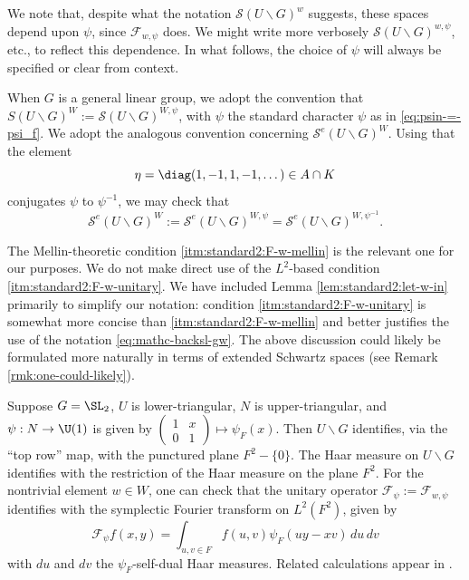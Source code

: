 \begin{remark}\label{rmk:we-note-that-dependence-psi-w}
  We note that, despite what the notation $\mathcal{S}(U \backslash G)^w$ suggests, these spaces depend upon $\psi$, since $\mathcal{F}_{w,\psi}$ does.  We might write more verbosely $\mathcal{S}(U \backslash G)^{w, \psi}$, etc., to reflect this dependence.  In what follows, the choice of $\psi$ will always be specified or clear from context.

  When $G$ is a general linear group, we adopt the convention that $S(U \backslash G)^W := \mathcal{S}(U \backslash G)^{W,\psi}$, with $\psi$ the standard character $\psi$ as in \eqref{eq:psin-=-psi_f}.  We adopt the analogous convention concerning $\mathcal{S}^e(U \backslash G)^W$.  Using that the element
  \begin{equation*}
    \eta = \diag(1,-1,1,-1,\dotsc) \in A \cap K
  \end{equation*}
  conjugates $\psi$ to $\psi^{-1}$, we may check that
  \begin{equation}\label{eq:mathc-backsl-gw-1}
    \mathcal{S}^e(U \backslash G)^W := \mathcal{S}^e(U \backslash G)^{W,\psi} = \mathcal{S}^e(U \backslash G)^{W,\psi^{-1}}.
  \end{equation}
\end{remark}

\begin{remark}
  The Mellin-theoretic condition \eqref{itm:standard2:F-w-mellin} is the relevant one for our purposes.  We do not make direct use of the $L^2$-based condition \eqref{itm:standard2:F-w-unitary}.  We have included Lemma \ref{lem:standard2:let-w-in} primarily to simplify our notation: condition \eqref{itm:standard2:F-w-unitary} is somewhat more concise than \eqref{itm:standard2:F-w-mellin} and better justifies the use of the notation \eqref{eq:mathc-backsl-gw}.  The above discussion could likely be formulated more naturally in terms of extended Schwartz spaces (see Remark \ref{rmk:one-could-likely}).
\end{remark}

\begin{example}
  Suppose $G = \SL_2$, $U$ is lower-triangular, $N$ is upper-triangular, and $\psi : N \rightarrow \U(1)$ is given by $\begin{pmatrix}
    1 & x \\
    0 & 1
  \end{pmatrix} \mapsto \psi_F(x)$. Then $U \backslash G$ identifies, via the ``top row'' map, with the punctured plane $F^2 - \{0\}$.  The Haar measure on $U \backslash G$ identifies with the restriction of the Haar measure on the plane $F^2$.  For the nontrivial element $w \in W$, one can check that the unitary operator $\mathcal{F}_{\psi} := \mathcal{F}_{w,\psi}$ identifies with the symplectic Fourier transform on $L^2(F^2)$, given by
  \begin{equation*}
    \mathcal{F}_{\psi} f(x,y) =
    \int_{u, v \in F}
    f(u, v) \psi_F(u y - x v)
    \, d u \, d v
  \end{equation*}
  with $d u$ and $d v$ the $\psi_F$-self-dual Haar measures.  Related calculations appear in \cite[\S3.4--\S3.6]{MR3468638}.
\end{example}


